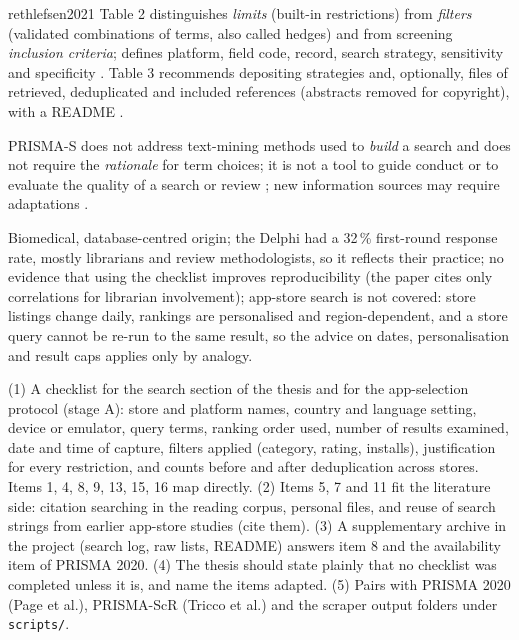 \begin{papercard}{rethlefsen2021}
 Table 2 distinguishes \emph{limits} (built-in restrictions) from \emph{filters} (validated combinations of terms, also called hedges) and from screening \emph{inclusion criteria}; defines platform, field code, record, search strategy, sensitivity and specificity . Table 3 recommends depositing strategies and, optionally, files of retrieved, deduplicated and included references (abstracts removed for copyright), with a README .

 PRISMA-S does not address text-mining methods used to \emph{build} a search and does not require the \emph{rationale} for term choices; it is not a tool to guide conduct or to evaluate the quality of a search or review ; new information sources may require adaptations .

 Biomedical, database-centred origin; the Delphi had a 32\,\% first-round response rate, mostly librarians and review methodologists, so it reflects their practice; no evidence that using the checklist improves reproducibility (the paper cites only correlations for librarian involvement); app-store search is not covered: store listings change daily, rankings are personalised and region-dependent, and a store query cannot be re-run to the same result, so the advice on dates, personalisation and result caps applies only by analogy.

 (1) A checklist for the search section of the thesis and for the app-selection protocol (stage A): store and platform names, country and language setting, device or emulator, query terms, ranking order used, number of results examined, date and time of capture, filters applied (category, rating, installs), justification for every restriction, and counts before and after deduplication across stores. Items 1, 4, 8, 9, 13, 15, 16 map directly. (2) Items 5, 7 and 11 fit the literature side: citation searching in the reading corpus, personal files, and reuse of search strings from earlier app-store studies (cite them). (3) A supplementary archive in the project (search log, raw lists, README) answers item 8 and the availability item of PRISMA 2020. (4) The thesis should state plainly that no checklist was completed unless it is, and name the items adapted. (5) Pairs with PRISMA 2020 (Page et al.), PRISMA-ScR (Tricco et al.) and the scraper output folders under \texttt{scripts/}.
\end{papercard}
